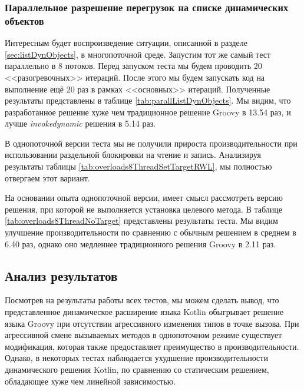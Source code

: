 \subsubsection{Параллельное разрешение перегрузок на списке динамических объектов}

Интересным будет воспроизведение ситуации, описанной в разделе \ref{sec:listDynObjects}, в многопоточной среде. Запустим тот же самый тест параллельно в 8 потоков. Перед запуском теста мы будем проводить 20 <<разогревочных>> итераций. После этого мы будем запускать код на выполнение ещё 20 раз в рамках <<основных>> итераций. Полученные результаты представлены в таблице \ref{tab:parallListDynObjects}. Мы видим, что разработанное решение хуже чем традиционное решение Groovy в 13.54 раз, и лучше \textit{invokedynamic} решения в 5.14 раз.

В однопоточной версии теста мы не получили прироста производительности при использовании раздельной блокировки на чтение и запись. Анализируя результаты таблицы \ref{tab:overloads8ThreadSetTargetRWL}, мы полностью отвергаем этот вариант.

На основании опыта однопоточной версии, имеет смысл рассмотреть версию решения, при которой не выполняется установка целевого метода. В таблице \ref{tab:overloads8ThreadNoTarget} представлены результаты теста. Мы видим улучшение производительности по сравнению с обычным решением в среднем в 6.40 раз, однако оно медленнее традиционного решения Groovy в 2.11 раз.

\subsection{Анализ результатов}

Посмотрев на результаты работы всех тестов, мы можем сделать вывод, что представленное динамическое расширение языка Kotlin обыгрывает решение языка Groovy при отсутствии агрессивного изменения типов в точке вызова. При агрессивной смене вызываемых методов в однопоточном режиме существует модификация, которая также предоставляет преимущество в производительности. Однако, в некоторых тестах наблюдается ухудшение производительности динамического решения Kotlin, по сравнению со статическим решением, обладающее хуже чем линейной зависимостью. 